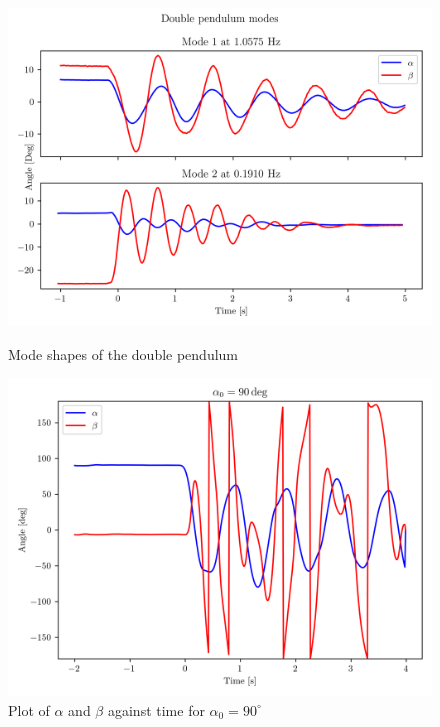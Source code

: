 \documentclass[8pt]{article}
\begin{document}
\begin{figure}[h]
    \centering
    \includegraphics[width=1\textwidth]{modes.png}
    \caption{Mode shapes of the double pendulum}
    \vspace{-1pt}
    \includegraphics[width=1\textwidth]{alpha90.png}
    \caption{Plot of $\alpha$ and $\beta$ against time for $\alpha_0 = 90^{\circ}$}
    \label{fig:phase_space}
\end{figure}

\vspace{-2cm}
\end{document}
